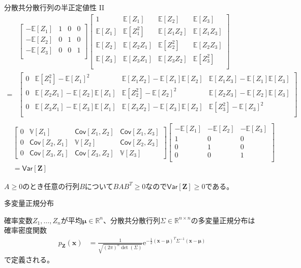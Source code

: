 \documentclass[lualatex,handout]{beamer}
\newcommand{\expt}[1]{\mathbb{E}\left[#1\right]}
\newcommand{\var}[1]{\mathbb{V}\left[#1\right]}
\newcommand{\cov}[1]{\mathsf{Cov}\left[#1\right]}
\newcommand{\vc}[1]{\mathsf{Var}\left[#1\right]}
\theoremstyle{definition}
\begin{document}
\begin{frame}{分散共分散行列の半正定値性 II}
\scriptsize
\begin{align*}
&
\begin{bmatrix}
-\expt{Z_1}&1&0&0\\
-\expt{Z_2}&0&1&0\\
-\expt{Z_3}&0&0&1\\
\end{bmatrix}
\begin{bmatrix}
1&\expt{Z_1}&\expt{Z_2}&\expt{Z_3}\\
\expt{Z_1}&\expt{Z_1^2}&\expt{Z_1Z_2}&\expt{Z_1Z_3}\\
\expt{Z_2}&\expt{Z_2Z_1}&\expt{Z_2^2}&\expt{Z_2Z_3}\\
\expt{Z_3}&\expt{Z_3Z_1}&\expt{Z_3Z_2}&\expt{Z_3^2}\\
\end{bmatrix}\\
=&
\begin{bmatrix}
0&\expt{Z_1^2}-\expt{Z_1}^2&\expt{Z_1Z_2}-\expt{Z_1}\expt{Z_2}&\expt{Z_1Z_3}-\expt{Z_1}\expt{Z_3}\\
0&\expt{Z_2Z_1}-\expt{Z_2}\expt{Z_1}&\expt{Z_2^2}-\expt{Z_2}^2&\expt{Z_2Z_3}-\expt{Z_2}\expt{Z_3}\\
0&\expt{Z_3Z_1}-\expt{Z_3}\expt{Z_1}&\expt{Z_3Z_2}-\expt{Z_3}\expt{Z_2}&\expt{Z_3^2}-\expt{Z_3}^2\\
\end{bmatrix}\\
\end{align*}
\begin{align*}
&
\begin{bmatrix}
0&\var{Z_1}&\cov{Z_1, Z_2}&\cov{Z_1, Z_3}\\
0&\cov{Z_2, Z_1}&\var{Z_2}&\cov{Z_2, Z_3}\\
0&\cov{Z_3, Z_1}&\cov{Z_3, Z_2}&\var{Z_3}
\end{bmatrix}
\begin{bmatrix}
-\expt{Z_1}& -\expt{Z_2}& -\expt{Z_3}\\
1&0&0\\
0&1&0\\
0&0&1\\
\end{bmatrix}\\
&=\vc{\symbf{Z}}
\end{align*}

$A\ge 0$のとき任意の行列$B$について$BAB^T\ge 0$なので$\vc{\symbf{Z}}\ge 0$である。
\end{frame}

\begin{frame}{多変量正規分布}
\begin{definition}[多変量正規分布]
確率変数$Z_1,\dotsc,Z_n$が平均$\symbf{\mu}\in\mathbb{R}^n$、分散共分散行列$\Sigma\in\mathbb{R}^{n\times n}$の多変量正規分布は確率密度関数
\begin{align*}
p_{\symbf{Z}}(\symbf{x}) &= \frac1{\sqrt{(2\pi)^n\det(\Sigma)}} \mathrm{e}^{-\frac12 (\symbf{x}-\symbf{\mu})^T\Sigma^{-1} (\symbf{x}-\symbf{\mu})}
\end{align*}
で定義される。
\end{definition}
\end{frame}
\end{document}

